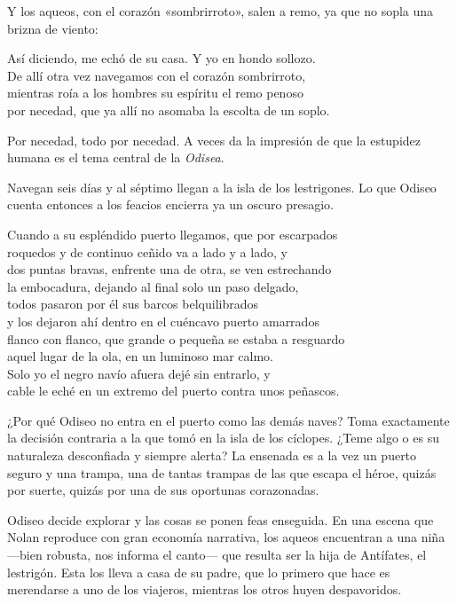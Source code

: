 Y los aqueos, con el corazón «sombrirroto», salen a remo, ya que no sopla una brizna de viento:

\begin{versocita}
Así diciendo, me echó de su casa. Y yo en hondo sollozo.\\
De allí otra vez navegamos con el corazón sombrirroto,\\
mientras roía a los hombres su espíritu el remo penoso\\
por necedad, que ya allí no asomaba la escolta de un soplo.
\end{versocita}

Por necedad, todo por necedad. A veces da la impresión de que la estupidez humana es el tema central de la \emph{Odisea}.

Navegan seis días y al séptimo llegan a la isla de los lestrigones. Lo que Odiseo cuenta entonces a los feacios encierra ya un oscuro presagio.

\begin{versocita}
Cuando a su espléndido puerto llegamos, que por escarpados\\
roquedos y de continuo ceñido va a lado y a lado, y\\
dos puntas bravas, enfrente una de otra, se ven estrechando\\
la embocadura, dejando al final solo un paso delgado,\\
todos pasaron por él sus barcos belquilibrados\\
y los dejaron ahí dentro en el cuéncavo puerto amarrados\\
flanco con flanco, que grande o pequeña se estaba a resguardo\\
aquel lugar de la ola, en un luminoso mar calmo.\\
Solo yo el negro navío afuera dejé sin entrarlo, y\\
cable le eché en un extremo del puerto contra unos peñascos.
\end{versocita}

¿Por qué Odiseo no entra en el puerto como las demás naves? Toma exactamente la decisión contraria a la que tomó en la isla de los cíclopes. ¿Teme algo o es su naturaleza desconfiada y siempre alerta? La ensenada es a la vez un puerto seguro y una trampa, una de tantas trampas de las que escapa el héroe, quizás por suerte, quizás por una de sus oportunas corazonadas.

Odiseo decide explorar y las cosas se ponen feas enseguida. En una escena que Nolan reproduce con gran economía narrativa, los aqueos encuentran a una niña ---bien robusta, nos informa el canto--- que resulta ser la hija de Antífates, el lestrigón. Esta los lleva a casa de su padre, que lo primero que hace es merendarse a uno de los viajeros, mientras los otros huyen despavoridos.


